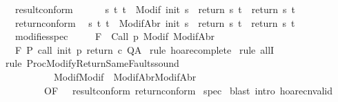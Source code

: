\begin{isabellebody}
\ \ \ result{\isacharunderscore}conform{\isacharcolon}\isanewline
\ \ \ \ \ \ {\isachardoublequoteopen}{\isasymforall}s\ t{\isachardot}\ t\ {\isasymin}\ Modif\ {\isacharparenleft}init\ s{\isacharparenright}\ {\isasymlongrightarrow}\ {\isacharparenleft}return{\isacharprime}\ s\ t{\isacharparenright}\ {\isacharequal}\ {\isacharparenleft}return\ s\ t{\isacharparenright}{\isachardoublequoteclose}\isanewline
\ \ \ return{\isacharunderscore}conform{\isacharcolon}\isanewline
\ \ {\isachardoublequoteopen}{\isasymforall}s\ t{\isachardot}\ t\ {\isasymin}\ ModifAbr\ {\isacharparenleft}init\ s{\isacharparenright}\ {\isasymlongrightarrow}\ {\isacharparenleft}return{\isacharprime}\ s\ t{\isacharparenright}\ {\isacharequal}\ {\isacharparenleft}return\ s\ t{\isacharparenright}{\isachardoublequoteclose}\isanewline
\ \ \ modifies{\isacharunderscore}spec{\isacharcolon}\ \ \isanewline
\ \ {\isachardoublequoteopen}{\isasymforall}{\isasymsigma}{\isachardot}\ {\isasymGamma}{\isacharcomma}{\isasymTheta}{\isasymturnstile}\isactrlbsub {\isacharslash}F\isactrlesub \ {\isacharbraceleft}{\isasymsigma}{\isacharbraceright}\ Call\ p\ {\isacharparenleft}Modif\ {\isasymsigma}{\isacharparenright}{\isacharcomma}{\isacharparenleft}ModifAbr\ {\isasymsigma}{\isacharparenright}{\isachardoublequoteclose}\isanewline
\ \ \ {\isachardoublequoteopen}{\isasymGamma}{\isacharcomma}{\isasymTheta}{\isasymturnstile}\isactrlbsub {\isacharslash}F\isactrlesub \ P\ {\isacharparenleft}call\ init\ p\ return\ c{\isacharparenright}\ Q{\isacharcomma}A{\isachardoublequoteclose}\isanewline
%
\isadelimproof
%
\endisadelimproof
%
\isatagproof
{}\isamarkupfalse%
\ {\isacharparenleft}rule\ hoare{\isacharunderscore}complete{\isacharprime}{\isacharparenright}\isanewline
{}\isamarkupfalse%
\ {\isacharparenleft}rule\ allI{\isacharparenright}\isanewline
{}\isamarkupfalse%
\ {\isacharparenleft}rule\ ProcModifyReturnSameFaults{\isacharunderscore}sound\ \isanewline
\ \ \ \ \ \ \ \ \ \ {\isacharbrackleft}\ Modif{\isacharequal}Modif\ \ ModifAbr{\isacharequal}ModifAbr{\isacharcomma}\ \isanewline
\ \ \ \ \ \ \ \ \ OF\ {\isacharunderscore}\ {\isacharunderscore}\ result{\isacharunderscore}conform\ return{\isacharunderscore}conform{\isacharbrackright}{\isacharparenright}\isanewline
{}\isamarkupfalse%
\ spec\isanewline
{}\isamarkupfalse%
\ {\isacharparenleft}blast\ intro{\isacharcolon}\ hoare{\isacharunderscore}cnvalid{\isacharparenright}\isanewline

\end{isabellebody}
